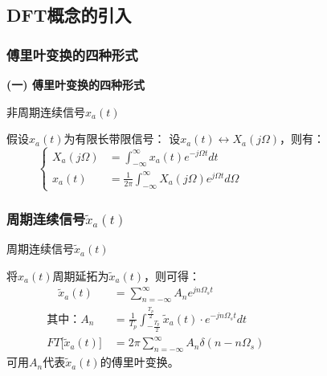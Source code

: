 \documentclass[notheorems,compress,mathserif,table]{beamer}
\begin{document}
\subsection{DFT概念的引入}
%
\begin{frame}[shrink]\frametitle{傅里叶变换的四种形式}%
\textbf{(一) 傅里叶变换的四种形式}


  非周期连续信号$x_a(t)$\par
  \par  假设$x_a(t)$为有限长带限信号：
     \newline\newline\newline\newline\newline
  设$x_a(t)\leftrightarrow X_a(j\Omega)$，则有：
  \begin{equation*}
  \left\{ \begin{aligned}
      X_a(j\Omega) &=  \int_{-\infty}^{\infty}x_a(t) e^{-j\Omega t}dt \qquad\qquad\qquad\qquad\qquad\qquad\qquad\\
      x_a(t)\:  &=  \frac{1}{2\pi}\int_{-\infty}^{\infty}X_a(j\Omega) e^{j\Omega t}d\Omega
  \end{aligned} \right.
  \end{equation*}

\end{frame}







\begin{frame}[shrink]\frametitle{周期连续信号$\tilde{x}_a(t)$}%

   周期连续信号$\tilde{x}_a(t)$

    将$x_a(t)$周期延拓为$\tilde{x}_a(t)$，则可得：
    \newline\newline\newline\newline
    \begin{equation*}
    \begin{split}
             \quad  \tilde{x}_a(t)\quad   &= \sum_{n=-\infty}^{\infty} A_n e^{j n \Omega_s t}\qquad\qquad\qquad\qquad\qquad\qquad\qquad\\
              \mbox{其中：}  A_n          &=  \frac{1}{T_p}\int_{-\frac{T_p}{2}}^{\frac{T_p}{2}}\tilde{x}_a(t)\cdot e^{-jn\Omega_s t}dt\\
              FT\big[\tilde{x}_a(t)\big]  &= 2\pi \sum_{n=-\infty}^{\infty} A_n \delta(n-n\Omega_s)
    \end{split}
    \end{equation*}
    可用$A_n$代表$\tilde{x}_a(t)$的傅里叶变换。
\end{frame}
\end{document}
